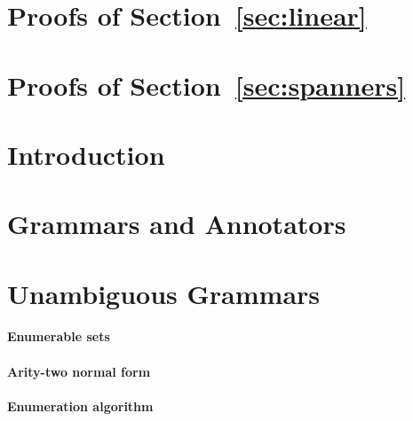 

\section{Proofs of Section~\ref{sec:linear}}
\label{apx:linear}



\section{Proofs of Section~\ref{sec:spanners}}





\section{Introduction}



\section{Grammars and Annotators}\label{sec:models}



\section{Unambiguous Grammars} \label{sec:cubic}



\paragraph{Enumerable sets}


\paragraph{Arity-two normal form}



\paragraph{Enumeration algorithm}


